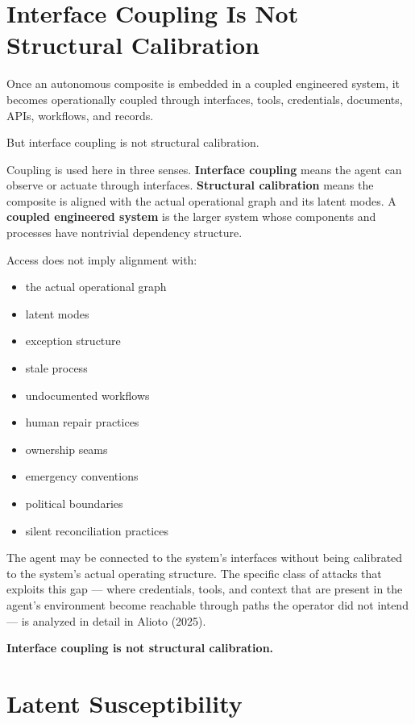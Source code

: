 \documentclass[11pt]{article}
\begin{document}
\section{Interface Coupling Is Not Structural Calibration}

Once an autonomous composite is embedded in a coupled engineered system, it becomes operationally coupled through interfaces, tools, credentials, documents, APIs, workflows, and records.

But interface coupling is not structural calibration.

Coupling is used here in three senses. \textbf{Interface coupling} means the agent can observe or actuate through interfaces. \textbf{Structural calibration} means the composite is aligned with the actual operational graph and its latent modes. A \textbf{coupled engineered system} is the larger system whose components and processes have nontrivial dependency structure.

Access does not imply alignment with:
\begin{itemize}
\item the actual operational graph
\item latent modes
\item exception structure
\item stale process
\item undocumented workflows
\item human repair practices
\item ownership seams
\item emergency conventions
\item political boundaries
\item silent reconciliation practices
\end{itemize}

The agent may be connected to the system's interfaces without being calibrated to the system's actual operating structure. The specific class of attacks that exploits this gap --- where credentials, tools, and context that are present in the agent's environment become reachable through paths the operator did not intend --- is analyzed in detail in Alioto (2025).

\begin{pullquote}
\textbf{Interface coupling is not structural calibration.}
\end{pullquote}

\section{Latent Susceptibility}
\end{document}
